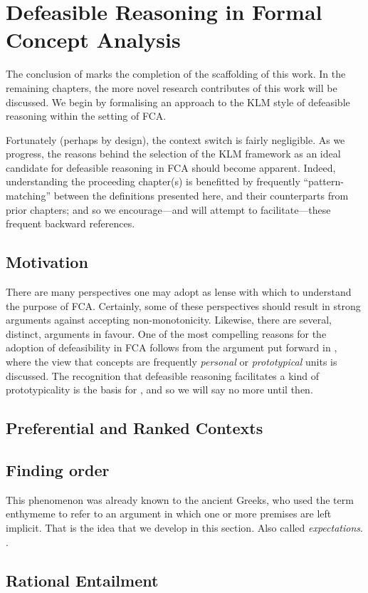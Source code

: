 \chapter{Defeasible Reasoning in Formal Concept Analysis}
\label{chapter:defeasible-reasoning-in-fca}

The conclusion of  marks the completion of the scaffolding of this work. In the
remaining chapters, the more novel research contributes of this work will be discussed. We begin by formalising an approach
to the KLM style of defeasible reasoning within the setting of FCA.

Fortunately (perhaps by design), the context switch is fairly negligible. As we progress, the reasons behind the
selection of the KLM framework as an ideal candidate for defeasible reasoning in FCA should become apparent. Indeed,
understanding the proceeding chapter(s) is benefitted by frequently ``pattern-matching'' between the definitions presented
here, and their counterparts from prior chapters; and so we encourage---and will attempt to facilitate---these frequent backward
references.

\section{Motivation}
\label{section:motivation}

There are many perspectives one may adopt as lense with which to understand the purpose of FCA. Certainly, some of these
perspectives should result in strong arguments against accepting non-monotonicity. Likewise, there are several, distinct,
arguments in favour. One of the most compelling reasons for the adoption of defeasibility in FCA follows from the argument
put forward in \cite{Wille2005}, where the view that concepts are frequently \textit{personal} or \textit{prototypical}
units is discussed. The recognition that defeasible reasoning facilitates a kind of prototypicality is the basis for ,
and so we will say no more until then.

\clearpage

\section{Preferential and Ranked Contexts}
\clearpage

\section{Finding order}
\clearpage
This phenomenon was already known to the ancient Greeks, who used the term enthymeme to refer to an argument in which one
or more premises are left implicit. That is the idea that we develop in this section. Also called \textit{expectations}.
\cite{makinson2003bridges}.

\section{Rational Entailment}
\clearpage